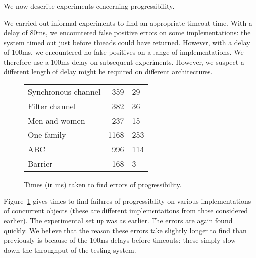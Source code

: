 We now describe experiments concerning progressibility.  

We carried out informal experiments to find an appropriate timeout time.  With
a delay of 80ms, we encountered false positive errors on some implementations:
the system timed out just before threads could have returned.  However, with
a delay of 100ms, we encountered no false positives on a range of
implementations.  We therefore use a 100ms delay on subsequent experiments.
However, we suspect a different length of delay might be required on different
architectures. 


\begin{figure}
\begin{center}
\begin{tabular}{lr@{$\null\pm\null$}l}
Synchronous channel  &	359	 & 29 \\
Filter channel  &	382	 & 36 \\
Men and women  &	237	 & 15 \\
One family  &	1168	 & 253 \\
ABC  &	996	 & 114 \\
Barrier  &	168	 & 3
\end{tabular}
\end{center}
\caption{Times (in ms) taken to find errors of
  progressibility.  \label{fig:progressibility-bugs}} 
\end{figure}



Figure~\ref{fig:progressibility-bugs} gives times to find failures of
progressibility on various implementations of concurrent objects (these are
different implementaitons from those considered earlier).  The experimental
set up was as earlier.  The errors are again found quickly.  We believe that
the reason these errors take slightly longer to find than previously is
because of the 100ms delays before timeouts: these simply slow down the
throughput of the testing system.




